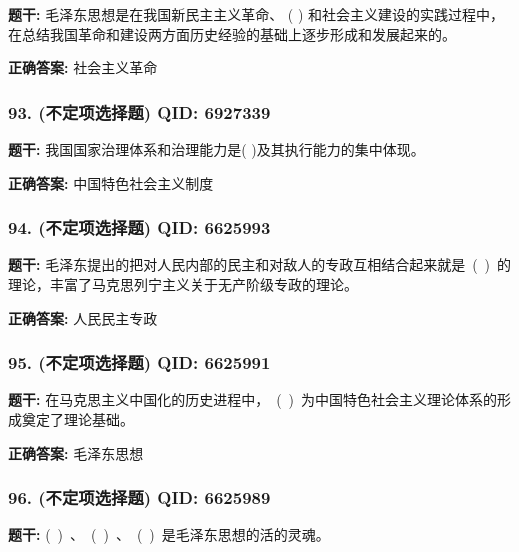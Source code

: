 \documentclass[12pt,UTF8]{ctexart}
\begin{document}
\textbf{题干:}
毛泽东思想是在我国新民主主义革命、 ( ) 和社会主义建设的实践过程中，在总结我国革命和建设两方面历史经验的基础上逐步形成和发展起来的。

\textbf{正确答案:}
社会主义革命

\vspace{0.3em}\hrulefill\vspace{0.7em}

\subsubsection*{93. (不定项选择题) \small QID: 6927339}

\textbf{题干:}
我国国家治理体系和治理能力是(  )及其执行能力的集中体现。

\textbf{正确答案:}
中国特色社会主义制度

\vspace{0.3em}\hrulefill\vspace{0.7em}

\subsubsection*{94. (不定项选择题) \small QID: 6625993}

\textbf{题干:}
毛泽东提出的把对人民内部的民主和对敌人的专政互相结合起来就是 ( ) 的理论，丰富了马克思列宁主义关于无产阶级专政的理论。

\textbf{正确答案:}
人民民主专政

\vspace{0.3em}\hrulefill\vspace{0.7em}

\subsubsection*{95. (不定项选择题) \small QID: 6625991}

\textbf{题干:}
在马克思主义中国化的历史进程中， ( ) 为中国特色社会主义理论体系的形成奠定了理论基础。

\textbf{正确答案:}
毛泽东思想

\vspace{0.3em}\hrulefill\vspace{0.7em}

\subsubsection*{96. (不定项选择题) \small QID: 6625989}

\textbf{题干:}
( ) 、 ( ) 、 ( ) 是毛泽东思想的活的灵魂。
\end{document}
